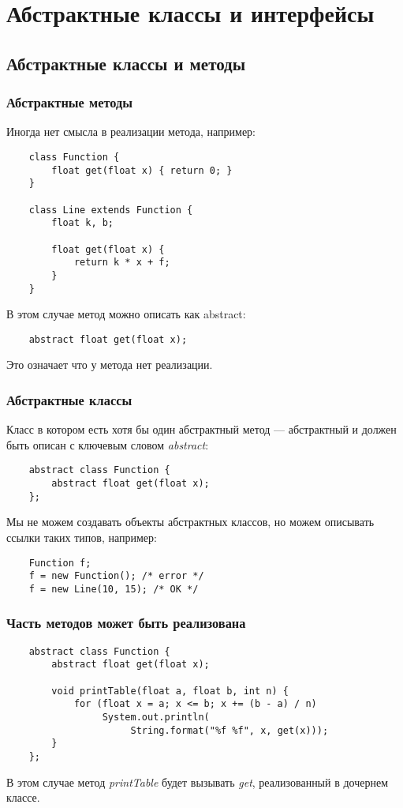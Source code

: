 \section{Абстрактные классы и интерфейсы}

\subsection{Абстрактные классы и методы}

\begin{frame}[fragile]
	\frametitle{Абстрактные методы}

	Иногда нет смысла в реализации метода, например:
	\begin{verbatim}
	class Function {
	    float get(float x) { return 0; }
	}

	class Line extends Function {
	    float k, b;

	    float get(float x) {
	        return k * x + f;
	    }
	}
	\end{verbatim}
	В этом случае метод можно описать как abstract:
	\begin{verbatim}
	abstract float get(float x);
	\end{verbatim}
	Это означает что у метода нет реализации.

\end{frame}


\begin{frame}[fragile]
	\frametitle{Абстрактные классы}
	\begin{large}
	Класс в котором есть хотя бы один абстрактный метод --- абстрактный и должен быть описан с ключевым словом \emph{abstract}:

	\begin{verbatim}
	abstract class Function {
	    abstract float get(float x);
	};
	\end{verbatim}

	Мы не можем создавать объекты абстрактных классов, но можем описывать ссылки таких типов, например:
	\begin{verbatim}
	Function f;
	f = new Function(); /* error */
	f = new Line(10, 15); /* OK */
	\end{verbatim}
	\end{large}
\end{frame}

\begin{frame}[fragile]
	\frametitle{Часть методов может быть реализована}

	\begin{verbatim}
	abstract class Function {
	    abstract float get(float x);

	    void printTable(float a, float b, int n) {
	        for (float x = a; x <= b; x += (b - a) / n)
	             System.out.println(
	                  String.format("%f %f", x, get(x)));
	    }
	};
	\end{verbatim}

	В этом случае метод \emph{printTable} будет вызывать \emph{get}, реализованный в дочернем классе.
\end{frame}

